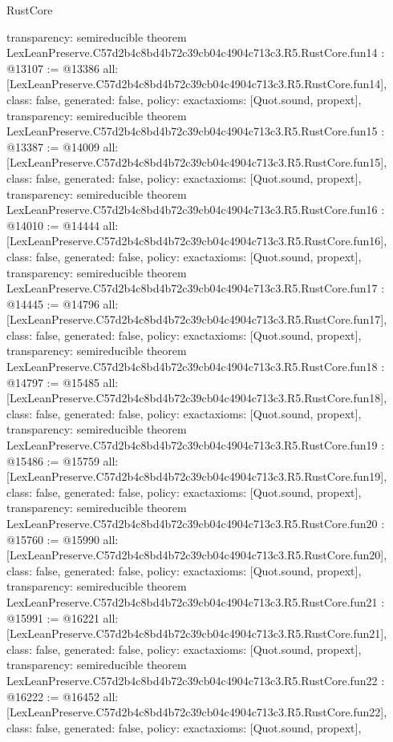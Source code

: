 \begin{lexlean}{RustCore}
\begin{coremodule}
{  transparency: semireducible
}
theorem LexLeanPreserve.C57d2b4c8bd4b72c39cb04c4904c713c3.R5.RustCore.fun14 : @13107 := @13386 {
  all: [LexLeanPreserve.C57d2b4c8bd4b72c39cb04c4904c713c3.R5.RustCore.fun14],
  class: false,
  generated: false,
  policy: exact{axioms: [Quot.sound, propext]},
  transparency: semireducible
}
theorem LexLeanPreserve.C57d2b4c8bd4b72c39cb04c4904c713c3.R5.RustCore.fun15 : @13387 := @14009 {
  all: [LexLeanPreserve.C57d2b4c8bd4b72c39cb04c4904c713c3.R5.RustCore.fun15],
  class: false,
  generated: false,
  policy: exact{axioms: [Quot.sound, propext]},
  transparency: semireducible
}
theorem LexLeanPreserve.C57d2b4c8bd4b72c39cb04c4904c713c3.R5.RustCore.fun16 : @14010 := @14444 {
  all: [LexLeanPreserve.C57d2b4c8bd4b72c39cb04c4904c713c3.R5.RustCore.fun16],
  class: false,
  generated: false,
  policy: exact{axioms: [Quot.sound, propext]},
  transparency: semireducible
}
theorem LexLeanPreserve.C57d2b4c8bd4b72c39cb04c4904c713c3.R5.RustCore.fun17 : @14445 := @14796 {
  all: [LexLeanPreserve.C57d2b4c8bd4b72c39cb04c4904c713c3.R5.RustCore.fun17],
  class: false,
  generated: false,
  policy: exact{axioms: [Quot.sound, propext]},
  transparency: semireducible
}
theorem LexLeanPreserve.C57d2b4c8bd4b72c39cb04c4904c713c3.R5.RustCore.fun18 : @14797 := @15485 {
  all: [LexLeanPreserve.C57d2b4c8bd4b72c39cb04c4904c713c3.R5.RustCore.fun18],
  class: false,
  generated: false,
  policy: exact{axioms: [Quot.sound, propext]},
  transparency: semireducible
}
theorem LexLeanPreserve.C57d2b4c8bd4b72c39cb04c4904c713c3.R5.RustCore.fun19 : @15486 := @15759 {
  all: [LexLeanPreserve.C57d2b4c8bd4b72c39cb04c4904c713c3.R5.RustCore.fun19],
  class: false,
  generated: false,
  policy: exact{axioms: [Quot.sound, propext]},
  transparency: semireducible
}
theorem LexLeanPreserve.C57d2b4c8bd4b72c39cb04c4904c713c3.R5.RustCore.fun20 : @15760 := @15990 {
  all: [LexLeanPreserve.C57d2b4c8bd4b72c39cb04c4904c713c3.R5.RustCore.fun20],
  class: false,
  generated: false,
  policy: exact{axioms: [Quot.sound, propext]},
  transparency: semireducible
}
theorem LexLeanPreserve.C57d2b4c8bd4b72c39cb04c4904c713c3.R5.RustCore.fun21 : @15991 := @16221 {
  all: [LexLeanPreserve.C57d2b4c8bd4b72c39cb04c4904c713c3.R5.RustCore.fun21],
  class: false,
  generated: false,
  policy: exact{axioms: [Quot.sound, propext]},
  transparency: semireducible
}
theorem LexLeanPreserve.C57d2b4c8bd4b72c39cb04c4904c713c3.R5.RustCore.fun22 : @16222 := @16452 {
  all: [LexLeanPreserve.C57d2b4c8bd4b72c39cb04c4904c713c3.R5.RustCore.fun22],
  class: false,
  generated: false,
  policy: exact{axioms: [Quot.sound, propext]},
}
\end{coremodule}
\end{lexlean}
